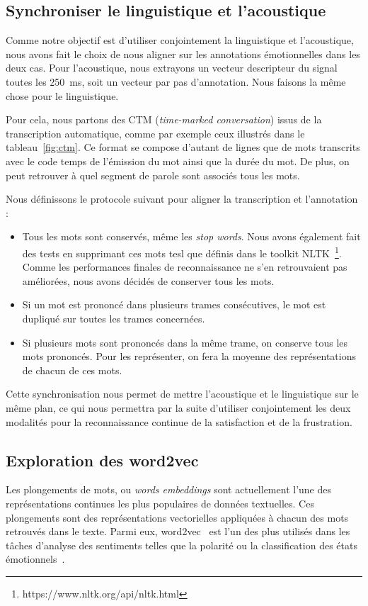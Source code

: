 \subsection{Synchroniser le linguistique et l'acoustique}
Comme notre objectif est d'utiliser conjointement la linguistique et l'acoustique, nous avons fait le choix de nous aligner sur les annotations émotionnelles dans les deux cas. Pour l'acoustique, nous extrayons un vecteur descripteur du signal toutes les 250~ms, soit un vecteur par pas d'annotation. Nous faisons la même chose pour le linguistique.

Pour cela, nous partons des CTM (\textit{time-marked conversation}) issus de la transcription automatique, comme par exemple ceux illustrés dans le tableau~\ref{fig:ctm}. Ce format se compose d'autant de lignes que de mots transcrits avec le code temps de l'émission du mot ainsi que la durée du mot. De plus, on peut retrouver à quel segment de parole sont associés tous les mots.




Nous définissons le protocole suivant pour aligner la transcription et l'annotation :
\begin{itemize}
  \item Tous les mots sont conservés, même les \textit{stop words}. Nous avons également fait des tests en supprimant ces mots tesl que définis dans le toolkit NLTK~\footnote{https://www.nltk.org/api/nltk.html}. Comme les performances finales de reconnaissance ne s'en retrouvaient pas améliorées, nous avons décidés de conserver tous les mots.
  \item Si un mot est prononcé dans plusieurs trames consécutives, le mot est dupliqué sur toutes les trames concernées.
  \item Si plusieurs mots sont prononcés dans la même trame, on conserve tous les mots prononcés. Pour les représenter, on fera la moyenne des représentations de chacun de ces mots.
\end{itemize}

Cette synchronisation nous permet de mettre l'acoustique et le linguistique sur le même plan, ce qui nous permettra par la suite d'utiliser conjointement les deux modalités pour la reconnaissance continue de la satisfaction et de la frustration.

\subsection{Exploration des word2vec}
Les plongements de mots, ou \textit{words embeddings} sont actuellement l'une des représentations continues les plus populaires de données textuelles. Ces plongements sont des représentations vectorielles appliquées à chacun des mots retrouvés dans le texte.
Parmi eux, word2vec~\cite{word2vec} est l'un des plus utilisés dans les tâches d'analyse des sentiments telles que la polarité ou la classification des états émotionnels~\cite{Dong2018}.

